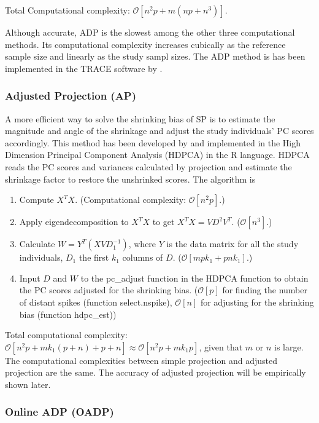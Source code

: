 \documentclass{article}
\newcommand{\bO}{\mathcal{O}}
\begin{document}
Total Computational complexity: $\bO[n^2p + m(np + n^3)]$.

Although accurate, ADP is the slowest among the other three computational methods.
Its computational complexity increases cubically as the reference sample size and linearly as the study sampl sizes.
The ADP method is has been implemented in the TRACE software by \cite{wang}.


\subsubsection{Adjusted Projection (AP)}

A more efficient way to solve the shrinking bias of SP is to estimate the
magnitude and angle of the shrinkage and adjust the study individuals' PC scores accordingly.
This method has been developed by \cite{dey} and implemented in the High
Dimension Principal Component Analysis (HDPCA) in the R language.
HDPCA reads the PC scores and variances calculated by projection and estimate the shrinkage factor to restore the unshrinked scores. 
The algorithm is
\begin{enumerate}
\item Compute $X^T X$.
  (Computational complexity: $\bO[n^2p]$.)  
\item Apply eigendecomposition to $X^T X$ to get $X^T X = V D^2 V^T$.
  ($\bO[n^3]$.)
\item Calculate $W = Y^T (X V D_1^{-1})$, where $Y$ is the data matrix for all the study individuals, $D_1$ the first $k_1$ columns of $D$. ($\bO[mpk_1 + pnk_1]$.)
  \item Input $D$ and $W$ to the pc\_adjust function in the HDPCA function to obtain the PC scores adjusted for the shrinking bias. ($\bO[p]$ for finding the number of distant spikes (function select.nspike), $\bO[n]$ for adjusting for the shrinking bias (function hdpc\_est))
\end{enumerate}

Total computational complexity: $\bO[n^2p + mk_1(p + n) + p + n] \approx \bO[n^2p + mk_1p]$,
given that $m$ or $n$ is large. The computational complexities between simple projection and adjusted projection are the same.
The accuracy of adjusted projection will be empirically shown later.

\subsubsection{Online ADP (OADP)}
\end{document}
